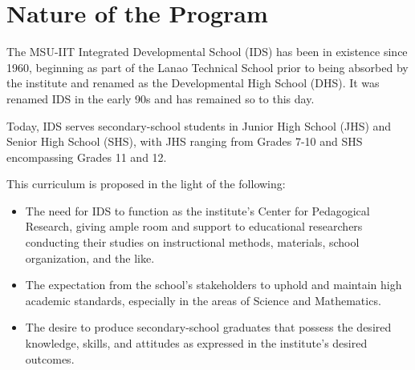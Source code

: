 \section{Nature of the Program}
The MSU-IIT Integrated Developmental School (IDS) has been in existence since 1960, beginning as part of the Lanao Technical School prior to being absorbed by the institute and renamed as the Developmental High School (DHS). It was renamed IDS in the early 90s and has remained so to this day.

Today, IDS serves secondary-school students in Junior High School (JHS) and Senior High School (SHS), with JHS ranging from Grades 7-10 and SHS encompassing Grades 11 and 12.

This curriculum is proposed in the light of the following:
\begin{itemize}
	\item{The need for IDS to function as the institute's Center for Pedagogical Research, giving ample room and support to educational researchers conducting their studies on instructional methods, materials, school organization, and the like.}
	\item{The expectation from the school's stakeholders to uphold and maintain high academic standards, especially in the areas of Science and Mathematics.}
	\item{The desire to produce secondary-school graduates that possess the desired knowledge, skills, and attitudes as expressed in the institute's desired outcomes.}
\end{itemize}

